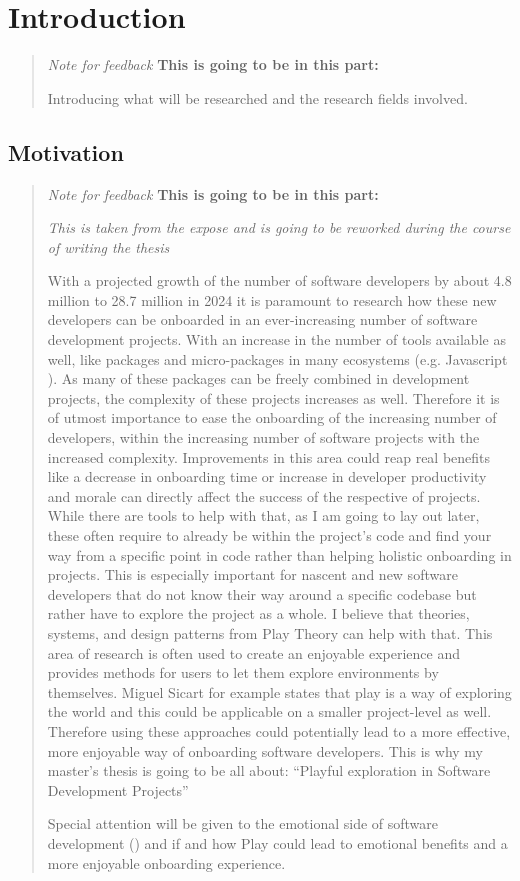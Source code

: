 \section{Introduction}


\blockquote{
  \textit{Note for feedback}
  \textbf{This is going to be in this part:}

  Introducing what will be researched and the research fields involved.

}

\subsection{Motivation}

\blockquote{
  \textit{Note for feedback}
  \textbf{This is going to be in this part:}

  \textit{This is taken from the expose and is going to be reworked during the course of writing the thesis}

  With a projected growth of the number of software developers by about 4.8 million to 28.7 million in 2024 \cite{evans2019developers} it is paramount to research how these new developers can be onboarded in an ever-increasing number of software development projects. With an increase in the number of tools available as well, like packages and micro-packages in many ecosystems (e.g. Javascript \cite{kula2017impact}). As many of these packages can be freely combined in development projects, the complexity of these projects increases as well. Therefore it is of utmost importance to ease the onboarding of the increasing number of developers, within the increasing number of software projects with the increased complexity. Improvements in this area could reap real benefits like a decrease in onboarding time or increase in developer productivity and morale can directly affect the success of the respective of projects. While there are tools to help with that, as I am going to lay out later, these often require to already be within the project’s code and find your way from a specific point in code rather than helping holistic onboarding in projects. This is especially important for nascent and new software developers that do not know their way around a specific codebase but rather have to explore the project as a whole. I believe that theories, systems, and design patterns from Play Theory can help with that. This area of research is often used to create an enjoyable experience and provides methods for users to let them explore environments by themselves. Miguel Sicart for example states that play is a way of exploring the world \cite[p. 3]{sicart2014play} and this could be applicable on a smaller project-level as well. Therefore using these approaches could potentially lead to a more effective, more enjoyable way of onboarding software developers. This is why my master’s thesis is going to be all about: “Playful exploration in Software Development Projects”

  Special attention will be given to the emotional side of software development (\cite{graziotin2017unhappiness,graziotin2018happens,ortu2016emotional}) and if and how Play could lead to emotional benefits and a more enjoyable onboarding experience.

}

